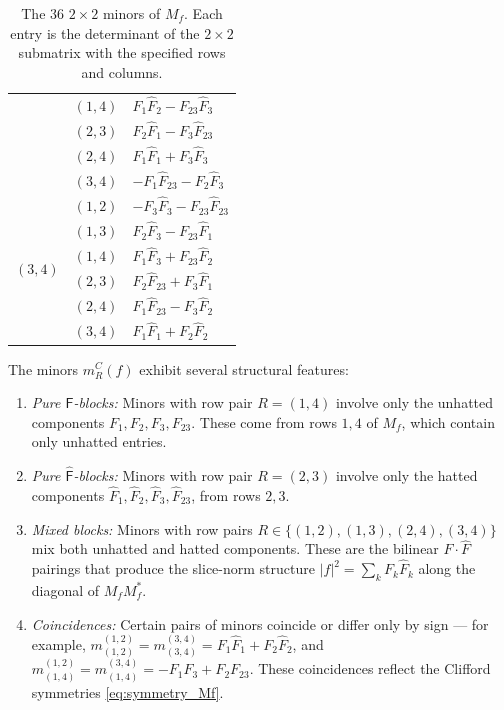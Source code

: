 \documentclass[11pt]{amsart}
\begin{document}
\begin{table}[h]
\begin{tabular}{c|c|l}
& $(1,4)$ & $F_1 \hat F_2 - F_{23} \hat F_3$ \\
& $(2,3)$ & $F_2 \hat F_1 - F_3 \hat F_{23}$ \\
& $(2,4)$ & $F_1 \hat F_1 + F_3 \hat F_3$ \\
& $(3,4)$ & $-F_1 \hat F_{23} - F_2 \hat F_3$ \\
\hline
\multirow{6}{*}{$(3,4)$}
& $(1,2)$ & $-F_3 \hat F_3 - F_{23} \hat F_{23}$ \\
& $(1,3)$ & $F_2 \hat F_3 - F_{23} \hat F_1$ \\
& $(1,4)$ & $F_1 \hat F_3 + F_{23} \hat F_2$ \\
& $(2,3)$ & $F_2 \hat F_{23} + F_3 \hat F_1$ \\
& $(2,4)$ & $F_1 \hat F_{23} - F_3 \hat F_2$ \\
& $(3,4)$ & $F_1 \hat F_1 + F_2 \hat F_2$ \\
\end{tabular}


\caption{The 36 $2\times 2$ minors of $M_f$. Each entry is the determinant of the $2\times 2$ submatrix with the specified rows and columns.}
\label{tab:Mf-22-minors}
\end{table}

\begin{rem}
The minors $m_R^C(f)$ exhibit several structural features:
\begin{enumerate}
\item \emph{Pure $\mathsf{F}$-blocks:} Minors with row pair $R = (1,4)$ involve only the unhatted components $F_1, F_2, F_3, F_{23}$. These come from rows $1, 4$ of $M_f$, which contain only unhatted entries.

\item \emph{Pure $\hat{\mathsf{F}}$-blocks:} Minors with row pair $R = (2,3)$ involve only the hatted components $\hat F_1, \hat F_2, \hat F_3, \hat F_{23}$, from rows $2, 3$.

\item \emph{Mixed blocks:} Minors with row pairs $R \in \{(1,2), (1,3), (2,4), (3,4)\}$ mix both unhatted and hatted components. These are the bilinear $F \cdot \hat F$ pairings that produce the slice-norm structure $|f|^2 = \displaystyle\sum_k F_k \hat F_k$ along the diagonal of $M_f M_f^*$.

\item \emph{Coincidences:} Certain pairs of minors coincide or differ only by sign --- for example, $m_{(1,2)}^{(1,2)} = m_{(3,4)}^{(3,4)} = F_1\hat F_1 + F_2\hat F_2$, and $m_{(1,4)}^{(1,2)} = m_{(1,4)}^{(3,4)} = -F_1 F_3 + F_2 F_{23}$. These coincidences reflect the Clifford symmetries \eqref{eq:symmetry_Mf}.
\end{enumerate}
\end{rem}
\end{document}
